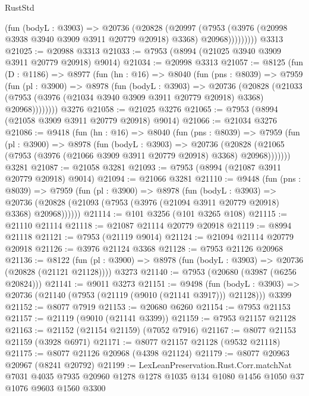 \begin{lexlean}{RustStd}
\begin{coremodule}
              (fun (bodyL : @3903) =>
              @20736
                (@20828
                  (@20997
                    (@7953
                      (@3976 (@20998 @3938 @3940 @3909 @3911 @20779 @20918) @3368)
                      @20968)))))))))
    @3313
@21025 := @20988 @3313
@21033 := @7953 (@8994 (@21025 @3940 @3909 @3911 @20779 @20918) @9014)
@21034 := @20998 @3313
@21057 := @8125
    (fun (D : @1186) =>
    @8977
      (fun (hn : @16) =>
      @8040
        (fun (pns : @8039) =>
        @7959
          (fun (pl : @3900) =>
          @8978
            (fun (bodyL : @3903) =>
            @20736
              (@20828
                (@21033 (@7953 (@3976 (@21034 @3940 @3909 @3911 @20779 @20918) @3368) @20968))))))))
    @3276
@21058 := @21025 @3276
@21065 := @7953 (@8994 (@21058 @3909 @3911 @20779 @20918) @9014)
@21066 := @21034 @3276
@21086 := @9418
    (fun (hn : @16) =>
    @8040
      (fun (pns : @8039) =>
      @7959
        (fun (pl : @3900) =>
        @8978
          (fun (bodyL : @3903) =>
          @20736
            (@20828 (@21065 (@7953 (@3976 (@21066 @3909 @3911 @20779 @20918) @3368) @20968)))))))
    @3281
@21087 := @21058 @3281
@21093 := @7953 (@8994 (@21087 @3911 @20779 @20918) @9014)
@21094 := @21066 @3281
@21110 := @9448
    (fun (pns : @8039) =>
    @7959
      (fun (pl : @3900) =>
      @8978
        (fun (bodyL : @3903) =>
        @20736 (@20828 (@21093 (@7953 (@3976 (@21094 @3911 @20779 @20918) @3368) @20968))))))
@21114 := @101 @3256 (@101 @3265 @108)
@21115 := @21110 @21114
@21118 := @21087 @21114 @20779 @20918
@21119 := @8994 @21118
@21121 := @7953 (@21119 @9014)
@21124 := @21094 @21114 @20779 @20918
@21126 := @3976 @21124 @3368
@21128 := @7953 @21126 @20968
@21136 := @8122
    (fun (pl : @3900) => @8978 (fun (bodyL : @3903) => @20736 (@20828 (@21121 @21128))))
    @3273
@21140 := @7953 (@20680 (@3987 (@6256 @20824)))
@21141 := @9011 @3273
@21151 := @9498
    (fun (bodyL : @3903) => @20736 (@21140 (@7953 (@21119 (@9010 (@21141 @3917))) @21128)))
    @3399
@21152 := @8077 @7919
@21153 := @20680 @6260
@21154 := @7953 @21153
@21157 := @21119 (@9010 (@21141 @3399))
@21159 := @7953 @21157 @21128
@21163 := @21152 (@21154 @21159) (@7052 @7916)
@21167 := @8077 @21153 @21159 (@3928 @6971)
@21171 := @8077 @21157 @21128 (@9532 @21118)
@21175 := @8077 @21126 @20968 (@4398 @21124)
@21179 := @8077 @20963 @20967 (@8241 @20792)
@21199 := LexLeanPreservation.Rust.Corr.matchNat
    @7031
    @4035
    @7935
    @20960
    @1278
    @1278
    @1035
    @134
    @1080
    @1456
    @1050
    @37
    @1076
    @9603
    @1560
    @3300

\end{coremodule}
\end{lexlean}
